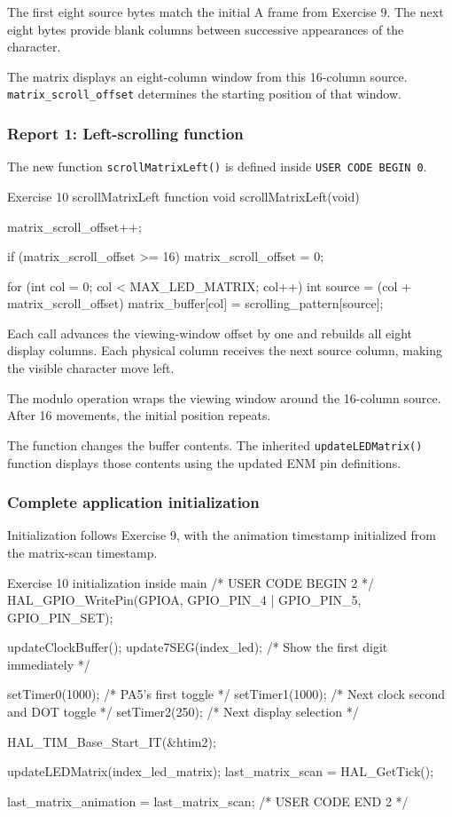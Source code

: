 \documentclass[a4paper]{article}
\begin{document}
The first eight source bytes match the
initial A frame from Exercise 9.
The next eight bytes provide blank columns
between successive appearances of the character.

The matrix displays an eight-column window
from this 16-column source.
\texttt{matrix\_scroll\_offset} determines
the starting position of that window.

\subsubsection{Report 1: Left-scrolling function}

The new function \texttt{scrollMatrixLeft()}
is defined inside \texttt{USER CODE BEGIN 0}.

\begin{stmcode}{Exercise 10 scrollMatrixLeft function}
void scrollMatrixLeft(void) {
  matrix_scroll_offset++;

  if (matrix_scroll_offset >= 16) {
    matrix_scroll_offset = 0;
  }

  for (int col = 0; col < MAX_LED_MATRIX; col++) {
    int source = (col + matrix_scroll_offset) %
    matrix_buffer[col] = scrolling_pattern[source];
  }
}
\end{stmcode}

Each call advances the viewing-window offset
by one and rebuilds all eight display columns.
Each physical column receives the next source
column, making the visible character move left.

The modulo operation wraps the viewing
window around the 16-column source.
After 16 movements, the initial position repeats.

The function changes the buffer contents.
The inherited \texttt{updateLEDMatrix()}
function displays those contents using
the updated ENM pin definitions.

\subsubsection{Complete application initialization}

Initialization follows Exercise 9, with
the animation timestamp initialized from
the matrix-scan timestamp.

\begin{stmcode}{Exercise 10 initialization inside main}
/* USER CODE BEGIN 2 */
HAL_GPIO_WritePin(GPIOA, GPIO_PIN_4 | GPIO_PIN_5, GPIO_PIN_SET);

updateClockBuffer();
update7SEG(index_led); /* Show the first digit immediately */

setTimer0(1000); /* PA5's first toggle */
setTimer1(1000); /* Next clock second and DOT toggle */
setTimer2(250);  /* Next display selection */

HAL_TIM_Base_Start_IT(&htim2);

updateLEDMatrix(index_led_matrix);
last_matrix_scan = HAL_GetTick();

last_matrix_animation = last_matrix_scan;
/* USER CODE END 2 */
\end{stmcode}
\end{document}
